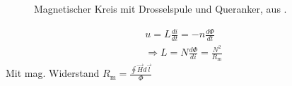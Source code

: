 \begin{frame}
\begin{columns}[onlytextwidth]
\begin{column}[t]{0.48\textwidth}
\begin{figure}
                \caption{Magnetischer Kreis mit Drosselspule und Queranker, aus \cite{traenkler2014}.}
            \end{figure}
            \begin{gather*}
                u = L \frac{d i}{d t} = -n \frac{d \Phi}{d t}\\
                \Rightarrow L = N \frac{d \Phi}{d i} = \frac{N^2}{R_{\textrm{m}}}
            \end{gather*}
            Mit mag. Widerstand $R_{\textrm{m}} = \frac{\oint \vec{H} d \vec{l}}{\Phi}$
        \end{column}
    \end{columns}

\end{frame}